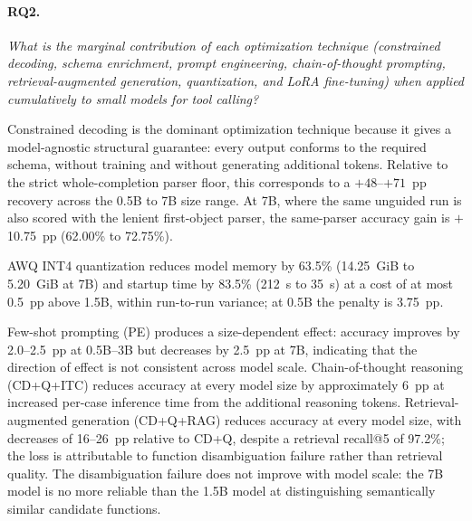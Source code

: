 \paragraph{RQ2.} \textit{What is the marginal contribution of each optimization
technique (constrained decoding, schema enrichment, prompt engineering,
chain-of-thought prompting, retrieval-augmented generation, quantization, and
LoRA fine-tuning) when applied cumulatively to
small models for tool calling?}

Constrained decoding is the dominant optimization technique because it gives a
model-agnostic structural guarantee: every output conforms to the required
schema, without training and without generating additional tokens. Relative to
the strict whole-completion parser floor, this corresponds to a $+48$--$+71$~pp
recovery across the 0.5B to 7B size range. At 7B, where the same unguided run
is also scored with the lenient first-object parser, the same-parser accuracy
gain is $+$10.75~pp (62.00\% to 72.75\%).

AWQ INT4 quantization reduces model memory by 63.5\% (14.25~GiB to
5.20~GiB at 7B) and startup time by 83.5\% (212~s to 35~s) at a
cost of at most 0.5~pp above 1.5B, within run-to-run
variance; at 0.5B the penalty is 3.75~pp.

Few-shot prompting (PE) produces a size-dependent effect: accuracy
improves by 2.0--2.5~pp at 0.5B--3B but decreases by 2.5~pp at
7B, indicating that the direction of
effect is not consistent across model scale.
Chain-of-thought reasoning (CD+Q+ITC) reduces accuracy at every
model size by approximately 6~pp at increased per-case inference time from the additional reasoning
tokens.
Retrieval-augmented generation (CD+Q+RAG) reduces accuracy at every
model size, with decreases of 16--26~pp relative to CD+Q, despite
a retrieval recall@5 of 97.2\%; the loss is attributable to function
disambiguation failure rather than retrieval quality.
The disambiguation failure does not improve with model scale: the
7B model is no more reliable than the 1.5B model at distinguishing
semantically similar candidate functions.

